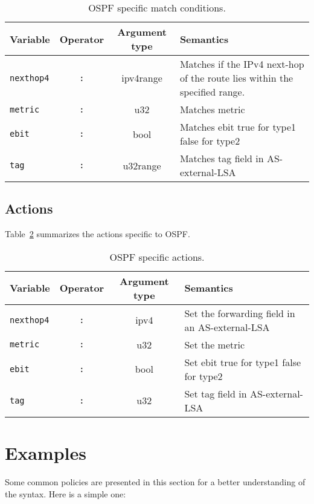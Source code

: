 \begin{table}[h]
\centering
\begin{tabular}{|l|c|c|p{7cm}|}
\hline
Variable & Operator & Argument type & Semantics \\
\hline\hline
{\tt nexthop4} & {\tt :} & ipv4range & Matches if the IPv4 next-hop of the route
lies within the specified range.\\

\hline
{\tt metric} & {\tt :} & u32 & Matches metric \\
\hline

\hline
{\tt ebit} & {\tt :} & bool & Matches ebit true for type1 false for type2 \\
\hline

\hline
{\tt tag} & {\tt :} & u32range & Matches tag field in AS-external-LSA \\
\hline

\end{tabular}
\caption{\label{policy_ospf_match}OSPF specific match conditions.}
\end{table}

\subsection{Actions}
Table~\ref{policy_ospf_action} summarizes the actions specific to OSPF.

\begin{table}[h]
\centering
\begin{tabular}{|l|c|c|p{7cm}|}
\hline
Variable & Operator & Argument type & Semantics \\
\hline\hline
{\tt nexthop4} & {\tt :} & ipv4 & Set the forwarding field in an
AS-external-LSA \\

\hline
{\tt metric} & {\tt :} & u32 & Set the metric \\
\hline

\hline
{\tt ebit} & {\tt :} & bool & Set ebit true for type1 false for type2 \\
\hline

\hline
{\tt tag} & {\tt :} & u32 & Set tag field in AS-external-LSA \\
\hline

\end{tabular}
\caption{\label{policy_ospf_action}OSPF specific actions.}
\end{table}

\section{Examples}
Some common policies are presented in this section for a better understanding of
the syntax.  Here is a simple one:

